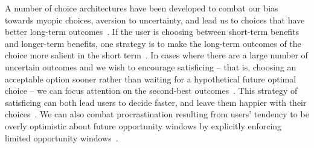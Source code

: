 A number of choice architectures have been developed to combat our bias towards myopic choices, aversion to uncertainty, and lead us to choices that have better long-term outcomes~\cite{johnson2012beyond}. If the user is choosing between short-term benefits and longer-term benefits, one strategy is to make the long-term outcomes of the choice more salient in the short term~\cite{weber2007asymmetric, soman2005psychology}. In cases where there are a large number of uncertain outcomes and we wish to encourage satisficing -- that is, choosing an acceptable option sooner rather than waiting for a hypothetical future optimal choice -- we can focus attention on the second-best outcomes~\cite{shu2008future}. This strategy of satisficing can both lead users to decide faster, and leave them happier with their choices~\cite{iyengar2006doing}. We can also combat procrastination resulting from users' tendency to be overly optimistic about future opportunity windows by explicitly enforcing limited opportunity windows~\cite{o1998procrastination}.






